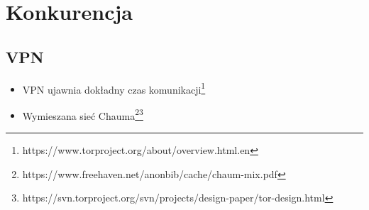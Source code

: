 \section{Konkurencja}
\subsection{VPN}
\begin{itemize}
 \item VPN ujawnia dokładny czas komunikacji\footnote{https://www.torproject.org/about/overview.html.en}
 \item Wymieszana sieć Chauma\footnote{https://www.freehaven.net/anonbib/cache/chaum-mix.pdf}\footnote{https://svn.torproject.org/svn/projects/design-paper/tor-design.html}
\end{itemize}